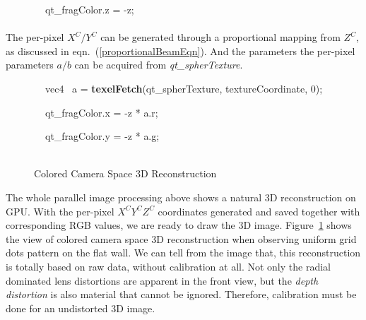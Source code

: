 {\ttfamily
\textcolor[rgb]{0.7529412,0.7529412,0.7529412}{\ \ \ \ \ \ \ \ }qt\_fragColor.z\textcolor[rgb]{0.7529412,0.7529412,0.7529412}{
}=\textcolor[rgb]{0.7529412,0.7529412,0.7529412}{ }{}-z;}
%
\\\\\noindent
The per-pixel \(X^C/Y^C\) can be generated through a proportional mapping from \(Z^C\), as discussed in eqn.~(\ref{proportionalBeamEqn}). And the parameters the per-pixel parameters \(a/b\) can be acquired from \emph{qt\_spherTexture}.
%

{\ttfamily
\textcolor[rgb]{0.7529412,0.7529412,0.7529412}{\ \ \ \ \ \ \ \  }\textcolor[rgb]{0.5019608,0.5019608,0.0}{vec4 }\textcolor[rgb]{0.7529412,0.7529412,0.7529412}{
\ }a\textcolor[rgb]{0.7529412,0.7529412,0.7529412}{
}=\textcolor[rgb]{0.7529412,0.7529412,0.7529412}{
}\textbf{\textcolor[rgb]{0.5019608,0.5019608,0.0}{texelFetch}}(qt\_spherTexture,\textcolor[rgb]{0.7529412,0.7529412,0.7529412}{
}textureCoordinate,\textcolor[rgb]{0.7529412,0.7529412,0.7529412}{
 }\textcolor[rgb]{0.0,0.0,0.5019608}{0});}

{\ttfamily
\textcolor[rgb]{0.7529412,0.7529412,0.7529412}{\ \ \ \ \ \ \ \ }qt\_fragColor.x\textcolor[rgb]{0.7529412,0.7529412,0.7529412}{
}=\textcolor[rgb]{0.7529412,0.7529412,0.7529412}{
}{}-z\textcolor[rgb]{0.7529412,0.7529412,0.7529412}{
}*\textcolor[rgb]{0.7529412,0.7529412,0.7529412}{ }a.r;}

{\ttfamily
\textcolor[rgb]{0.7529412,0.7529412,0.7529412}{\ \ \ \ \ \ \ \ }qt\_fragColor.y\textcolor[rgb]{0.7529412,0.7529412,0.7529412}{
}=\textcolor[rgb]{0.7529412,0.7529412,0.7529412}{
}{}-z\textcolor[rgb]{0.7529412,0.7529412,0.7529412}{
}*\textcolor[rgb]{0.7529412,0.7529412,0.7529412}{ }a.g;}
%
\\\\\noindent%
%
\begin{figure}[b]
\centering
{}
\caption{Colored Camera Space 3D Reconstruction}
\label{reconstructionInCameraSpace}
\end{figure}%
%
The whole parallel image processing above shows a natural 3D reconstruction on GPU. With the per-pixel \(X^CY^CZ^C\) coordinates generated and saved together with corresponding RGB values, we are ready to draw the 3D image. Figure~\ref{reconstructionInCameraSpace} shows the view of colored camera space 3D reconstruction when observing uniform grid dots pattern on the flat wall. We can tell from the image that, this reconstruction is totally based on raw data, without calibration at all. Not only the radial dominated lens distortions are apparent in the front view, but the \emph{depth distortion} is also material that cannot be ignored. Therefore, calibration must be done for an undistorted 3D image.

